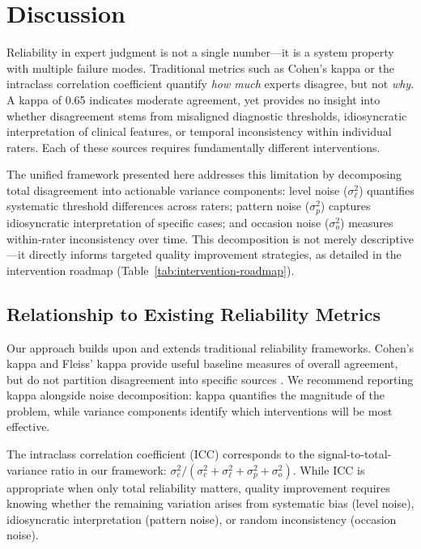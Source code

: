 \section*{Discussion}

Reliability in expert judgment is not a single number---it is a system property with multiple failure modes. Traditional metrics such as Cohen's kappa or the intraclass correlation coefficient quantify \textit{how much} experts disagree, but not \textit{why}. A kappa of 0.65 indicates moderate agreement, yet provides no insight into whether disagreement stems from misaligned diagnostic thresholds, idiosyncratic interpretation of clinical features, or temporal inconsistency within individual raters. Each of these sources requires fundamentally different interventions.

The unified framework presented here addresses this limitation by decomposing total disagreement into actionable variance components: level noise ($\sigma_\ell^2$) quantifies systematic threshold differences across raters; pattern noise ($\sigma_p^2$) captures idiosyncratic interpretation of specific cases; and occasion noise ($\sigma_o^2$) measures within-rater inconsistency over time. This decomposition is not merely descriptive---it directly informs targeted quality improvement strategies, as detailed in the intervention roadmap (Table~\ref{tab:intervention-roadmap}).

\subsection*{Relationship to Existing Reliability Metrics}

Our approach builds upon and extends traditional reliability frameworks. Cohen's kappa and Fleiss' kappa provide useful baseline measures of overall agreement, but do not partition disagreement into specific sources \cite{Kahneman2021}. We recommend reporting kappa alongside noise decomposition: kappa quantifies the magnitude of the problem, while variance components identify which interventions will be most effective. 

The intraclass correlation coefficient (ICC) corresponds to the signal-to-total-variance ratio in our framework: $\sigma_c^2 / (\sigma_c^2 + \sigma_\ell^2 + \sigma_p^2 + \sigma_o^2)$. While ICC is appropriate when only total reliability matters, quality improvement requires knowing whether the remaining variation arises from systematic bias (level noise), idiosyncratic interpretation (pattern noise), or random inconsistency (occasion noise).

